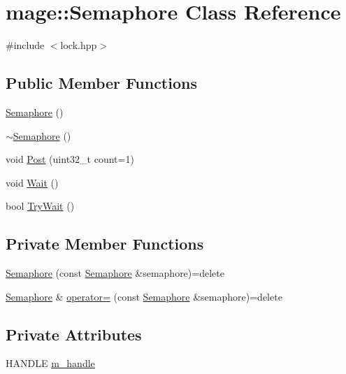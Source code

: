 \hypertarget{classmage_1_1_semaphore}{}\section{mage\+:\+:Semaphore Class Reference}
\label{classmage_1_1_semaphore}


{\ttfamily \#include $<$lock.\+hpp$>$}

\subsection*{Public Member Functions}
\begin{DoxyCompactItemize}
\item 
\hyperlink{classmage_1_1_semaphore_a7b4f53c18b9a244ed98ef58fa5cfa2bb}{Semaphore} ()
\item 
\hyperlink{classmage_1_1_semaphore_a991ed365c28e4a9c63ff34a5efeb012d}{$\sim$\+Semaphore} ()
\item 
void \hyperlink{classmage_1_1_semaphore_a354ea9743f9794b14a3f032e0443b214}{Post} (uint32\+\_\+t count=1)
\item 
void \hyperlink{classmage_1_1_semaphore_ae63599939b6bcc3939cbeddd7ffa5f66}{Wait} ()
\item 
bool \hyperlink{classmage_1_1_semaphore_ab34cdf4e9b7388dbdb30aab167c074f6}{Try\+Wait} ()
\end{DoxyCompactItemize}
\subsection*{Private Member Functions}
\begin{DoxyCompactItemize}
\item 
\hyperlink{classmage_1_1_semaphore_a8873b2ed82ff66d323a8c3cebf0fb5c0}{Semaphore} (const \hyperlink{classmage_1_1_semaphore}{Semaphore} \&semaphore)=delete
\item 
\hyperlink{classmage_1_1_semaphore}{Semaphore} \& \hyperlink{classmage_1_1_semaphore_af3308cf7fa1ed33cda0ee53b9565f658}{operator=} (const \hyperlink{classmage_1_1_semaphore}{Semaphore} \&semaphore)=delete
\end{DoxyCompactItemize}
\subsection*{Private Attributes}
\begin{DoxyCompactItemize}
\item 
H\+A\+N\+D\+LE \hyperlink{classmage_1_1_semaphore_ac1ded856984b4ac3739d9ff627838fda}{m\+\_\+handle}
\end{DoxyCompactItemize}


